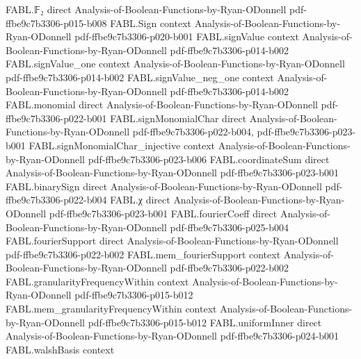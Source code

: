 \begin{theorem}
\label{FABL.example3_19_fourier_expansion}
\leanok
{}
\proofstep
  {FABL.𝔽₂}
  {direct}
  {Analysis-of-Boolean-Functions-by-Ryan-ODonnell}
  {pdf-ffbe9c7b3306-p015-b008}
\proofstep
  {FABL.Sign}
  {context}
  {Analysis-of-Boolean-Functions-by-Ryan-ODonnell}
  {pdf-ffbe9c7b3306-p020-b001}
\proofstep
  {FABL.signValue}
  {context}
  {Analysis-of-Boolean-Functions-by-Ryan-ODonnell}
  {pdf-ffbe9c7b3306-p014-b002}
\proofstep
  {FABL.signValue_one}
  {context}
  {Analysis-of-Boolean-Functions-by-Ryan-ODonnell}
  {pdf-ffbe9c7b3306-p014-b002}
\proofstep
  {FABL.signValue_neg_one}
  {context}
  {Analysis-of-Boolean-Functions-by-Ryan-ODonnell}
  {pdf-ffbe9c7b3306-p014-b002}
\proofstep
  {FABL.monomial}
  {direct}
  {Analysis-of-Boolean-Functions-by-Ryan-ODonnell}
  {pdf-ffbe9c7b3306-p022-b001}
\proofstep
  {FABL.signMonomialChar}
  {direct}
  {Analysis-of-Boolean-Functions-by-Ryan-ODonnell}
  {pdf-ffbe9c7b3306-p022-b004,
    pdf-ffbe9c7b3306-p023-b001}
\proofstep
  {FABL.signMonomialChar_injective}
  {context}
  {Analysis-of-Boolean-Functions-by-Ryan-ODonnell}
  {pdf-ffbe9c7b3306-p023-b006}
\proofstep
  {FABL.coordinateSum}
  {direct}
  {Analysis-of-Boolean-Functions-by-Ryan-ODonnell}
  {pdf-ffbe9c7b3306-p023-b001}
\proofstep
  {FABL.binarySign}
  {direct}
  {Analysis-of-Boolean-Functions-by-Ryan-ODonnell}
  {pdf-ffbe9c7b3306-p022-b004}
\proofstep
  {FABL.χ}
  {direct}
  {Analysis-of-Boolean-Functions-by-Ryan-ODonnell}
  {pdf-ffbe9c7b3306-p023-b001}
\proofstep
  {FABL.fourierCoeff}
  {direct}
  {Analysis-of-Boolean-Functions-by-Ryan-ODonnell}
  {pdf-ffbe9c7b3306-p025-b004}
\proofstep
  {FABL.fourierSupport}
  {direct}
  {Analysis-of-Boolean-Functions-by-Ryan-ODonnell}
  {pdf-ffbe9c7b3306-p022-b002}
\proofstep
  {FABL.mem_fourierSupport}
  {context}
  {Analysis-of-Boolean-Functions-by-Ryan-ODonnell}
  {pdf-ffbe9c7b3306-p022-b002}
\proofstep
  {FABL.granularityFrequencyWithin}
  {context}
  {Analysis-of-Boolean-Functions-by-Ryan-ODonnell}
  {pdf-ffbe9c7b3306-p015-b012}
\proofstep
  {FABL.mem_granularityFrequencyWithin}
  {context}
  {Analysis-of-Boolean-Functions-by-Ryan-ODonnell}
  {pdf-ffbe9c7b3306-p015-b012}
\proofstep
  {FABL.uniformInner}
  {direct}
  {Analysis-of-Boolean-Functions-by-Ryan-ODonnell}
  {pdf-ffbe9c7b3306-p024-b001}
\proofstep
  {FABL.walshBasis}
  {context}

\end{theorem}

